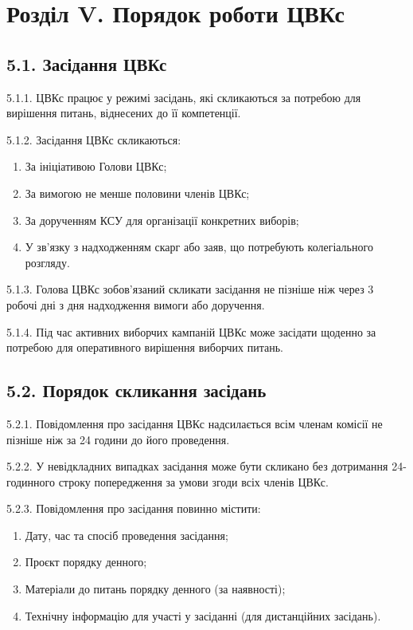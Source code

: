 \section*{Розділ V. Порядок роботи ЦВКс}

\subsection*{5.1. Засідання ЦВКс}
    5.1.1. ЦВКс працює у режимі засідань, які скликаються за потребою для вирішення питань, віднесених до її компетенції.

    5.1.2. Засідання ЦВКс скликаються:

        \begin{enumerate}[label=\alph*)]
            \item За ініціативою Голови ЦВКс;
            \item За вимогою не менше половини членів ЦВКс;
            \item За дорученням КСУ для організації конкретних виборів;
            \item У зв'язку з надходженням скарг або заяв, що потребують колегіального розгляду.
        \end{enumerate}

    5.1.3. Голова ЦВКс зобов'язаний скликати засідання не пізніше ніж через 3 робочі дні з дня надходження вимоги або доручення.

    5.1.4. Під час активних виборчих кампаній ЦВКс може засідати щоденно за потребою для оперативного вирішення виборчих питань.

\subsection*{5.2. Порядок скликання засідань}
    5.2.1. Повідомлення про засідання ЦВКс надсилається всім членам комісії не пізніше ніж за 24 години до його проведення.

    5.2.2. У невідкладних випадках засідання може бути скликано без дотримання 24-годинного строку попередження за умови згоди всіх членів ЦВКс.

    5.2.3. Повідомлення про засідання повинно містити:

        \begin{enumerate}[label=\alph*)]
            \item Дату, час та спосіб проведення засідання;
            \item Проєкт порядку денного;
            \item Матеріали до питань порядку денного (за наявності);
            \item Технічну інформацію для участі у засіданні (для дистанційних засідань).
        \end{enumerate}

